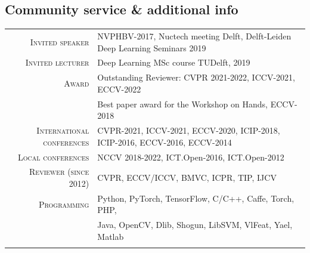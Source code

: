 \documentclass[a4paper, oneside, final]{scrartcl}
\begin{document}
\begin{center}
		\section{Community service \& additional info}
		\begin{tabular}{r@{\hskip 0.3in}p{12.3cm}}
            \textsc{Invited speaker}            & NVPHBV-2017, Nuctech meeting Delft, Delft-Leiden Deep Learning Seminars 2019\\
            \textsc{Invited lecturer}           & Deep Learning MSc course TUDelft, 2019\\
            \textsc{Award}                      & Outstanding Reviewer: CVPR 2021-2022, ICCV-2021, ECCV-2022\\ 
                                                & Best paper award for the Workshop on Hands, ECCV-2018\\  
            \textsc{International conferences}  & CVPR-2021, ICCV-2021, ECCV-2020, ICIP-2018, ICIP-2016, ECCV-2016, ECCV-2014\\
            \textsc{Local conferences}          & NCCV 2018-2022, ICT.Open-2016, ICT.Open-2012\\
            \textsc{Reviewer (since 2012)}      & CVPR, ECCV/ICCV, BMVC, ICPR, TIP, IJCV\\
			\textsc{Programming}                & Python, PyTorch, TensorFlow, C\slash C++, Caffe, Torch, PHP,\\ 
			                                    & Java, OpenCV, Dlib, Shogun, LibSVM, VlFeat, Yael, Matlab\\
			\multicolumn{2}{c}{}\\
		\end{tabular}
	\end{center}
\end{document}
